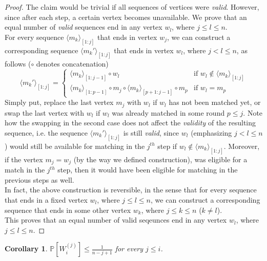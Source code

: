 \documentclass[11pt]{article}
\newtheorem{corollary}{Corollary}[claim]
\begin{document}
\begin{proof}
    The claim would be trivial if all sequences of vertices were \textit{valid}. However, since after
    each step, a certain vertex becomes unavailable. We prove that an equal number of \textit{valid}
    sequences end in any vertex $w_{l}$, where $j \leq l \leq n$. \\
    For every sequence $\langle m_{k} \rangle_{[1:j]}$ that ends in vertex $w_{j}$, we can construct
    a corresponding sequence $\langle m_{k}' \rangle_{[1:j]}$ that ends in vertex $w_{l}$, where
    $j < l \leq n$, as follows ($\circ$ denotes concatenation)
    \begin{equation}
        \langle m_{k}' \rangle_{[1:j]} = \begin{cases}
            \langle m_{k} \rangle_{[1:j-1]} \circ w_{l} & \text{if } w_{l} \notin \langle m_{k} \rangle_{[1:j]} \\
            \langle m_{k} \rangle_{[1:p-1]} \circ m_{j} \circ \langle m_{k} \rangle_{[p+1:j-1]} \circ m_{p} & \text{if } w_{l} = m_{p}
        \end{cases}
    \end{equation}
    Simply put, replace the last vertex $m_{j}$ with $w_{l}$ if $w_{l}$ has not been matched yet, or
    swap the last vertex with $w_{l}$ if $w_{l}$ was already matched in some round $p \leq j$. Note how the swapping in the
    second case does not affect the \textit{validity} of the resulting sequence, i.e. the sequence
    $\langle m_{k}' \rangle_{[1:j]}$ is still \textit{valid}, since $w_{l}$ (emphasizing
    $j < l \leq n$) would still be available for matching in the $j^{th}$ step if $w_{l} \notin \langle m_{k} \rangle_{[1:j]}$.
    Moreover, if the vertex $m_{j} = w_{j}$ (by the way we defined construction),
    was eligible for a match in the $j^{th}$ step, then it would have been eligible for matching
    in the previous steps as well. \\
    In fact, the above construction is reversible, in the sense that for every sequence that ends in a fixed
    vertex $w_{l}$, where $j \leq l \leq n$, we can construct a corresponding sequence
    that ends in some other vertex $w_{k}$, where $j \leq k \leq n$ ($k \neq l$). \\
    This proves that an equal number of valid seqeunces end in any vertex $w_{l}$, where $j \leq l \leq n$.
\end{proof}
\begin{corollary}
    $\mathbb{P} \left[ W_{i}^{(j)} \right] \leq \frac{1}{n-j+1}$ for every $j \leq i$.
\end{corollary}
\end{document}
